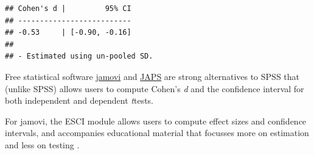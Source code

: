 \documentclass[
  oneside]{book}
\begin{document}
\begin{verbatim}
## Cohen's d |         95% CI
## --------------------------
## -0.53     | [-0.90, -0.16]
## 
## - Estimated using un-pooled SD.
\end{verbatim}

Free statistical software \href{https://www.jamovi.org/}{jamovi} and \href{https://jasp-stats.org/}{JAPS} are strong alternatives to SPSS that (unlike SPSS) allows users to compute Cohen's \emph{d} and the confidence interval for both independent and dependent \emph{t}tests.

For jamovi, the ESCI module allows users to compute effect sizes and confidence intervals, and accompanies educational material that focusses more on estimation and less on testing \citep{cumming_introduction_2016}.
\end{document}
